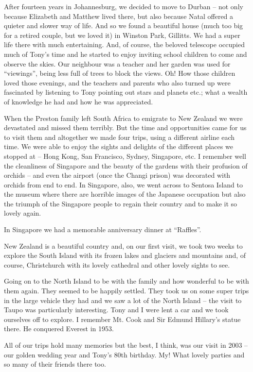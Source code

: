 After fourteen years in Johannesburg, we decided to move to Durban --
not only because Elizabeth and Matthew lived there, but also because
Natal offered a quieter and slower way of life. And so we found a
beautiful house (much too big for a retired couple, but we loved it)
in Winston Park, Gillitts. We had a super life there with much
entertaining. And, of course, the beloved telescope occupied much of
Tony's time and he started to enjoy inviting school children to come
and observe the skies. Our neighbour was a teacher and her garden was
used for ``viewings'', being less full of trees to block the
views. Oh! How those children loved those evenings, and the teachers
and parents who also turned up were fascinated by listening to Tony
pointing out stars and planets etc.; what a wealth of knowledge he had
and how he was appreciated.

When the Preston family left South Africa to emigrate to New Zealand
we were devastated and missed them terribly. But the time and
opportunities came for us to visit them and altogether we made four
trips, using a different airline each time. We were able to enjoy the
sights and delights of the different places we stopped at -- Hong
Kong, San Francisco, Sydney, Singapore, etc. I remember well the
cleanliness of Singapore and the beauty of the gardens with their
profusion of orchids -- and even the airport (once the Changi prison)
was decorated with orchids from end to end. In Singapore, also, we
went across to Sentosa Island to the museum where there are horrible
images of the Japanese occupation but also the triumph of the
Singapore people to regain their country and to make it so lovely
again.

In Singapore we had a memorable anniversary dinner at ``Raffles''.

New Zealand is a beautiful country and, on our first visit, we took
two weeks to explore the South Island with its frozen lakes and
glaciers and mountains and, of course, Christchurch with its lovely
cathedral and other lovely sights to see.

Going on to the North Island to be with the family and how wonderful
to be with them again. They seemed to be happily settled. They took us
on some super trips in the large vehicle they had and we saw a lot of
the North Island -- the visit to Taupo was particularly
interesting. Tony and I were lent a car and we took ourselves off to
explore. I remember Mt. Cook and Sir Edmund Hillary's statue there. He
conquered Everest in 1953.

All of our trips hold many memories but the best, I think, was our
visit in 2003 -- our golden wedding year and Tony's 80th birthday. My!
What lovely parties and so many of their friends there too.

